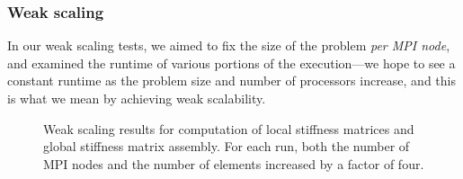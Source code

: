 \subsubsection{Weak scaling}\label{sec:weakScaling}
In our weak scaling tests, we aimed to fix the size of the problem \emph{per MPI node}, and examined the runtime of various portions of the execution---we hope to see a constant runtime as the problem size and number of processors increase, and this is what we mean by achieving weak scalability.

\begin{figure}[h!]
\centering
{}
\caption{Weak scaling results for computation of local stiffness matrices and global stiffness matrix assembly.  For each run, both the number of MPI nodes and the number of elements increased by a factor of four.}
\end{figure}

